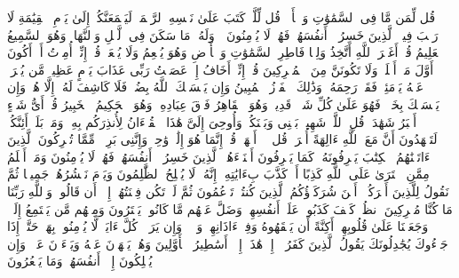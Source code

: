 \startbuffer[\q:6:12]
قُل لِّمَن مَّا فِی ٱلسَّمَٰوَٰتِ وَٱلۡأَرۡضِۖ قُل لِّلَّهِۚ كَتَبَ عَلَىٰ نَفۡسِهِ ٱلرَّحۡمَةَۚ لَیَجۡمَعَنَّكُمۡ إِلَىٰ یَوۡمِ ٱلۡقِیَٰمَةِ لَا رَیۡبَ فِیهِۚ ٱلَّذِینَ خَسِرُوۤا۟ أَنفُسَهُمۡ فَهُمۡ لَا یُؤۡمِنُونَ%
\stopbuffer%
\startbuffer[\q:6:13]
۞ وَلَهُۥ مَا سَكَنَ فِی ٱلَّیۡلِ وَٱلنَّهَارِۚ وَهُوَ ٱلسَّمِیعُ ٱلۡعَلِیمُ%
\stopbuffer%
\startbuffer[\q:6:14]
قُلۡ أَغَیۡرَ ٱللَّهِ أَتَّخِذُ وَلِیࣰّا فَاطِرِ ٱلسَّمَٰوَٰتِ وَٱلۡأَرۡضِ وَهُوَ یُطۡعِمُ وَلَا یُطۡعَمُۗ قُلۡ إِنِّیۤ أُمِرۡتُ أَنۡ أَكُونَ أَوَّلَ مَنۡ أَسۡلَمَۖ وَلَا تَكُونَنَّ مِنَ ٱلۡمُشۡرِكِینَ%
\stopbuffer%
\startbuffer[\q:6:15]
قُلۡ إِنِّیۤ أَخَافُ إِنۡ عَصَیۡتُ رَبِّی عَذَابَ یَوۡمٍ عَظِیمࣲ%
\stopbuffer%
\startbuffer[\q:6:16]
مَّن یُصۡرَفۡ عَنۡهُ یَوۡمَئِذࣲ فَقَدۡ رَحِمَهُۥۚ وَذَٰلِكَ ٱلۡفَوۡزُ ٱلۡمُبِینُ%
\stopbuffer%
\startbuffer[\q:6:17]
وَإِن یَمۡسَسۡكَ ٱللَّهُ بِضُرࣲّ فَلَا كَاشِفَ لَهُۥۤ إِلَّا هُوَۖ وَإِن یَمۡسَسۡكَ بِخَیۡرࣲ فَهُوَ عَلَىٰ كُلِّ شَیۡءࣲ قَدِیرࣱ%
\stopbuffer%
\startbuffer[\q:6:18]
وَهُوَ ٱلۡقَاهِرُ فَوۡقَ عِبَادِهِۦۚ وَهُوَ ٱلۡحَكِیمُ ٱلۡخَبِیرُ%
\stopbuffer%
\startbuffer[\q:6:19]
قُلۡ أَیُّ شَیۡءٍ أَكۡبَرُ شَهَٰدَةࣰۖ قُلِ ٱللَّهُۖ شَهِیدُۢ بَیۡنِی وَبَیۡنَكُمۡۚ وَأُوحِیَ إِلَیَّ هَٰذَا ٱلۡقُرۡءَانُ لِأُنذِرَكُم بِهِۦ وَمَنۢ بَلَغَۚ أَئِنَّكُمۡ لَتَشۡهَدُونَ أَنَّ مَعَ ٱللَّهِ ءَالِهَةً أُخۡرَىٰۚ قُل لَّاۤ أَشۡهَدُۚ قُلۡ إِنَّمَا هُوَ إِلَٰهࣱ وَٰحِدࣱ وَإِنَّنِی بَرِیۤءࣱ مِّمَّا تُشۡرِكُونَ%
\stopbuffer%
\startbuffer[\q:6:20]
ٱلَّذِینَ ءَاتَیۡنَٰهُمُ ٱلۡكِتَٰبَ یَعۡرِفُونَهُۥ كَمَا یَعۡرِفُونَ أَبۡنَاۤءَهُمُۘ ٱلَّذِینَ خَسِرُوۤا۟ أَنفُسَهُمۡ فَهُمۡ لَا یُؤۡمِنُونَ%
\stopbuffer%
\startbuffer[\q:6:21]
وَمَنۡ أَظۡلَمُ مِمَّنِ ٱفۡتَرَىٰ عَلَى ٱللَّهِ كَذِبًا أَوۡ كَذَّبَ بِءَایَٰتِهِۦۤۚ إِنَّهُۥ لَا یُفۡلِحُ ٱلظَّٰلِمُونَ%
\stopbuffer%
\startbuffer[\q:6:22]
وَیَوۡمَ نَحۡشُرُهُمۡ جَمِیعࣰا ثُمَّ نَقُولُ لِلَّذِینَ أَشۡرَكُوۤا۟ أَیۡنَ شُرَكَاۤؤُكُمُ ٱلَّذِینَ كُنتُمۡ تَزۡعُمُونَ%
\stopbuffer%
\startbuffer[\q:6:23]
ثُمَّ لَمۡ تَكُن فِتۡنَتُهُمۡ إِلَّاۤ أَن قَالُوا۟ وَٱللَّهِ رَبِّنَا مَا كُنَّا مُشۡرِكِینَ%
\stopbuffer%
\startbuffer[\q:6:24]
ٱنظُرۡ كَیۡفَ كَذَبُوا۟ عَلَىٰۤ أَنفُسِهِمۡۚ وَضَلَّ عَنۡهُم مَّا كَانُوا۟ یَفۡتَرُونَ%
\stopbuffer%
\startbuffer[\q:6:25]
وَمِنۡهُم مَّن یَسۡتَمِعُ إِلَیۡكَۖ وَجَعَلۡنَا عَلَىٰ قُلُوبِهِمۡ أَكِنَّةً أَن یَفۡقَهُوهُ وَفِیۤ ءَاذَانِهِمۡ وَقۡرࣰاۚ وَإِن یَرَوۡا۟ كُلَّ ءَایَةࣲ لَّا یُؤۡمِنُوا۟ بِهَاۖ حَتَّىٰۤ إِذَا جَاۤءُوكَ یُجَٰدِلُونَكَ یَقُولُ ٱلَّذِینَ كَفَرُوۤا۟ إِنۡ هَٰذَاۤ إِلَّاۤ أَسَٰطِیرُ ٱلۡأَوَّلِینَ%
\stopbuffer%
\startbuffer[\q:6:26]
وَهُمۡ یَنۡهَوۡنَ عَنۡهُ وَیَنۡءَوۡنَ عَنۡهُۖ وَإِن یُهۡلِكُونَ إِلَّاۤ أَنفُسَهُمۡ وَمَا یَشۡعُرُونَ%
